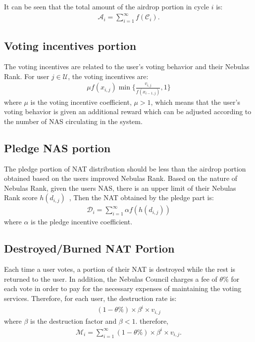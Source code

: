 It can be seen that the total amount of the airdrop portion in cycle $i$ is:
\begin{align}
\mathcal{A}_i = \sum_{i=1}^{\infty}f(\mathcal{C}_i).
\end{align}

\subsection{Voting incentives portion}
The voting incentives are related to the user's voting behavior and their Nebulas Rank. For user $j \in \mathcal{U}$, the voting incentives are:
\begin{align}
\mu f(x_{i,j}) \min\{\frac{v_{i,j}}{f(x_{i-1,j})},1\}
\end{align}
\noindent where $\mu$ is the voting incentive coefficient, $\mu > 1$, which means that the user's voting behavior is given an additional reward which can be adjusted according to the number of NAS circulating in the system.

\subsection{Pledge NAS portion}
The pledge portion of NAT distribution should be less than the airdrop portion obtained based on the users improved Nebulas Rank. Based on the nature of Nebulas Rank, given the users NAS, there is an upper limit of their Nebulas Rank  score $h(d_{i,j})$~\cite{ImproveNR},
Then the NAT obtained by the pledge part is:
\begin{align}
\mathcal{D}_i = \sum_{i=1}^{\infty}\alpha f(h(d_{i,j}))
\end{align}
\noindent where $\alpha$ is the pledge incentive coefficient.


\subsection{Destroyed/Burned NAT Portion}
\label{burn}
Each time a user votes, a portion of their NAT is destroyed while the rest is returned to the user. In addition, the Nebulas Council charges a fee of $\theta\%$ for each vote in order to pay for the necessary expenses of maintaining the voting services. Therefore, for each user, the destruction rate is:
\begin{align}
(1-\theta\%) \times \beta^i \times v_{i,j}
\end{align}
\noindent where $\beta$ is the destruction factor and $\beta < 1$. therefore,
\begin{align}
    \mathcal{M}_i = \sum_{i=1}^{\infty} (1-\theta\%) \times \beta^i \times v_{i,j} .
\end{align}

